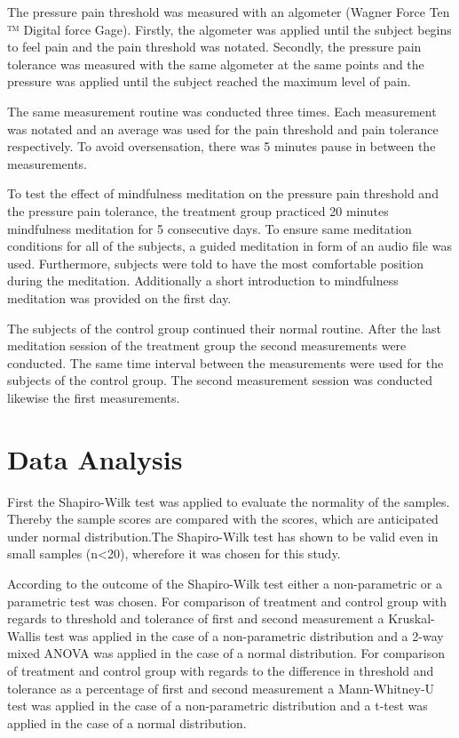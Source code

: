 The pressure pain threshold was measured with an algometer (Wagner Force Ten ™  Digital force Gage). Firstly, the algometer was applied until the subject begins to feel pain and the pain threshold was notated. Secondly, the pressure pain tolerance was measured with the same algometer at the same points and the pressure was applied until the subject reached the maximum level of pain.

The same measurement routine was conducted three times. Each measurement was notated and an average was used for the pain threshold and pain tolerance respectively. To avoid oversensation, there was 5 minutes pause in between the measurements. 

To test the effect of mindfulness meditation on the pressure pain threshold and the pressure pain tolerance, the treatment group practiced 20 minutes mindfulness meditation for 5 consecutive days. To ensure same meditation conditions for all of the subjects, a guided meditation in form of an audio file was used. Furthermore, subjects were told to have the most comfortable position during the meditation.  Additionally a short introduction to mindfulness meditation was provided on the first day. 

The subjects of the control group continued their normal routine.
After the last meditation session of the treatment group the second measurements were conducted. The same time interval between the measurements were used for the subjects of the control group. The second measurement session was conducted likewise the first measurements.


\section{Data Analysis}
First the Shapiro-Wilk test was applied to evaluate the normality of the samples. Thereby the sample scores are compared with the scores, which are anticipated under normal distribution.The Shapiro-Wilk test has shown to be valid even in small samples (n<20), wherefore it was chosen for this study. \cite{Shapiro1965,Mooi2018}


According to the outcome of the Shapiro-Wilk test either a non-parametric or a parametric test was chosen.
For comparison of treatment and control group with regards to threshold and tolerance of first and second measurement a Kruskal-Wallis test was applied in the case of a non-parametric distribution and a 2-way mixed ANOVA was applied in the case of a normal distribution.
For comparison of treatment and control group with regards to the difference in threshold and tolerance as a percentage of first and second measurement a Mann-Whitney-U test was applied in the case of a non-parametric distribution and a t-test was applied in the case of a normal distribution.


